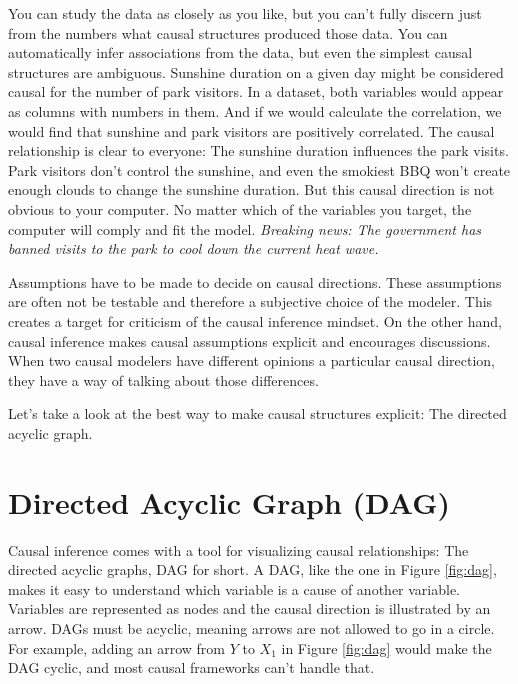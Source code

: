 \documentclass[
  10pt,
]{scrbook}
\begin{document}
You can study the data as closely as you like, but you can't fully discern just from the numbers what causal structures produced those data.
You can automatically infer associations from the data, but even the simplest causal structures are ambiguous.
Sunshine duration on a given day might be considered causal for the number of park visitors.
In a dataset, both variables would appear as columns with numbers in them.
And if we would calculate the correlation, we would find that sunshine and park visitors are positively correlated.
The causal relationship is clear to everyone:
The sunshine duration influences the park visits.
Park visitors don't control the sunshine, and even the smokiest BBQ won't create enough clouds to change the sunshine duration.
But this causal direction is not obvious to your computer.
No matter which of the variables you target, the computer will comply and fit the model.
\emph{Breaking news: The government has banned visits to the park to cool down the current heat wave.}

Assumptions have to be made to decide on causal directions.
These assumptions are often not be testable and therefore a subjective choice of the modeler.
This creates a target for criticism of the causal inference mindset.
On the other hand, causal inference makes causal assumptions explicit and encourages discussions.
When two causal modelers have different opinions a particular causal direction, they have a way of talking about those differences.

Let's take a look at the best way to make causal structures explicit: The directed acyclic graph.

\hypertarget{directed-acyclic-graph-dag}{%
\section{Directed Acyclic Graph (DAG)}\label{directed-acyclic-graph-dag}}

Causal inference comes with a tool for visualizing causal relationships: The directed acyclic graphs, DAG for short.
A DAG, like the one in Figure \ref{fig:dag}, makes it easy to understand which variable is a cause of another variable.
Variables are represented as nodes and the causal direction is illustrated by an arrow.
DAGs must be acyclic, meaning arrows are not allowed to go in a circle.
For example, adding an arrow from \(Y\) to \(X_1\) in Figure \ref{fig:dag} would make the DAG cyclic, and most causal frameworks can't handle that.
\end{document}

